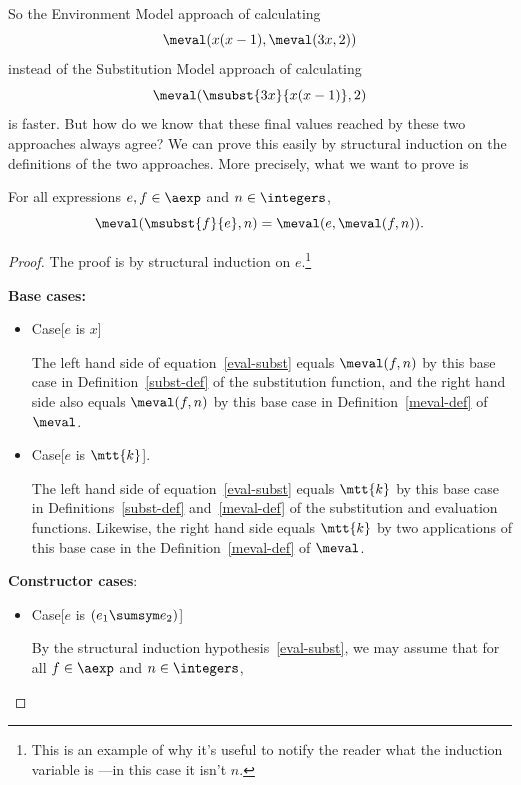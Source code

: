 \begin{definition}
So the Environment Model approach of calculating
\[
\meval(x(x-1), \meval(3x,2))
\]
instead of the Substitution Model approach of calculating
\[
\meval(\msubst{3x}{x(x-1)},2)
\]
is faster.  But how do we know that these final values reached by these
two approaches always agree?  We can prove this easily by structural
induction on the definitions of the two approaches.  More precisely, what
we want to prove is

\begin{theorem}\label{environments}
For all expressions $e,f \in \aexp$ and $n \in \integers$,
\begin{equation}\label{eval-subst}
\meval(\msubst{f}{e},n) = \meval(e, \meval(f,n)).
\end{equation}
\end{theorem}

\begin{proof}
The proof is by structural induction on $e$.\footnote{This is an example
of why it's useful to notify the reader what the induction variable is
---in this case it isn't $n$.}

\textbf{Base cases:}
\begin{itemize}

\item Case[$e$ is $x$]

  The left hand side of equation~\eqref{eval-subst} equals $\meval(f,n)$
  by this base case in Definition~\ref{subst-def} of the substitution
  function, and the right hand side also equals $\meval(f,n)$ by this base
  case in Definition~\ref{meval-def} of $\meval$.


\item Case[$e$ is $\mtt{k}$].

  The left hand side of equation~\eqref{eval-subst} equals $\mtt{k}$ by
  this base case in Definitions~\ref{subst-def} and~\ref{meval-def} of
  the substitution and evaluation functions.  Likewise, the right hand
  side equals $\mtt{k}$ by two applications of this base case in the
  Definition~\ref{meval-def} of $\meval$.

\end{itemize}

\textbf{Constructor cases}:
\begin{itemize}

\item Case[$e$ is $(e_1 \sumsym e_2)$]

  By the structural induction hypothesis~\eqref{eval-subst}, we may assume
  that for all $f \in \aexp$ and $n \in \integers$,


\end{itemize}
\end{proof}
\end{definition}
